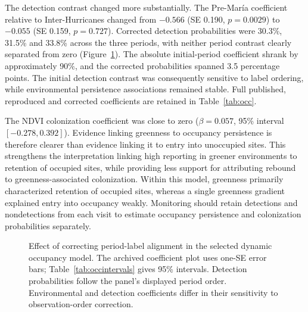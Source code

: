 The detection contrast changed more substantially. The Pre-Mar\'ia coefficient relative to Inter-Hurricanes changed from $-0.566$ (SE 0.190, $p=0.0029$) to $-0.055$ (SE 0.159, $p=0.727$). Corrected detection probabilities were 30.3\%, 31.5\% and 33.8\% across the three periods, with neither period contrast clearly separated from zero (Figure~\ref{fig:ordering}). The absolute initial-period coefficient shrank by approximately 90\%, and the corrected probabilities spanned 3.5 percentage points. The initial detection contrast was consequently sensitive to label ordering, while environmental persistence associations remained stable. Full published, reproduced and corrected coefficients are retained in Table~\ref{tab:occ}.

The NDVI colonization coefficient was close to zero ($\beta=0.057$, 95\% interval $[-0.278,0.392]$). Evidence linking greenness to occupancy persistence is therefore clearer than evidence linking it to entry into unoccupied sites. This strengthens the interpretation linking high reporting in greener environments to retention of occupied sites, while providing less support for attributing rebound to greenness-associated colonization. Within this model, greenness primarily characterized retention of occupied sites, whereas a single greenness gradient explained entry into occupancy weakly. Monitoring should retain detections and nondetections from each visit to estimate occupancy persistence and colonization probabilities separately.
\begin{figure}[htbp]\centering
{}
\caption{Effect of correcting period-label alignment in the selected dynamic occupancy model. The archived coefficient plot uses one-SE error bars; Table~\ref{tab:occintervals} gives 95\% intervals. Detection probabilities follow the panel's displayed period order. Environmental and detection coefficients differ in their sensitivity to observation-order correction.}\label{fig:ordering}
\end{figure}
\FloatBarrier


